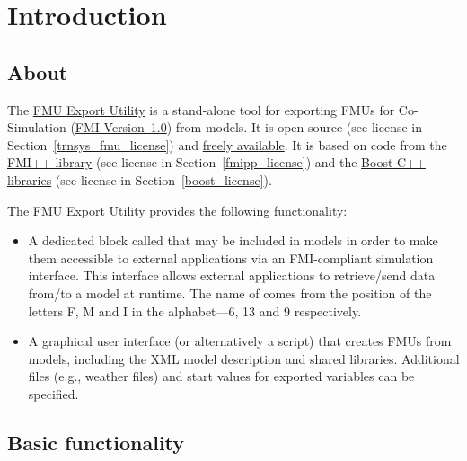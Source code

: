 \chapter{Introduction}


\section{About}

The \href{http://trnsys-fmu.sourceforge.net}{\fmipp \trnsys FMU Export Utility} is a stand-alone tool for exporting FMUs for Co-Simulation (\href{https://www.fmi-standard.org/}{FMI Version~1.0}) from \href{http://www.trnsys.com/}{\trnsys} models. It is open-source (see license in Section~\ref{trnsys_fmu_license}) and \href{http://trnsys-fmu.sourceforge.net}{freely available}. It is based on code from the \href{http://fmipp.sourceforge.net}{FMI++ library} (see license in Section~\ref{fmipp_license}) and the \href{http://www.boost.org/}{Boost C++ libraries} (see license in Section~\ref{boost_license}).

The \fmipp \trnsys FMU Export Utility provides the following functionality:
\begin{itemize}
  \item A dedicated \trnsys block called \type that may be included in \trnsys models in order to make them accessible to external applications via an FMI-compliant simulation interface. This interface allows external applications to retrieve/send data from/to a \trnsys model at runtime. The name of \type comes from the position of the letters F, M and I in the alphabet---6, 13 and 9 respectively.
  \item A graphical user interface (or alternatively a \href{https://www.python.org/}{\python} script) that creates FMUs from \trnsys models, including the XML model description and shared libraries. Additional files (e.g., weather files) and start values for exported variables can be specified.
\end{itemize}

\section{Basic functionality}

